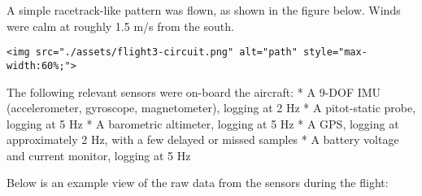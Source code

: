 \documentclass[11pt]{article}
\begin{document}
A simple racetrack-like pattern was flown, as shown in the figure below.
Winds were calm at roughly 1.5 m/s from the south.

\begin{verbatim}
<img src="./assets/flight3-circuit.png" alt="path" style="max-width:60%;">
\end{verbatim}

The following relevant sensors were on-board the aircraft: * A 9-DOF IMU
(accelerometer, gyroscope, magnetometer), logging at 2 Hz * A
pitot-static probe, logging at 5 Hz * A barometric altimeter, logging at
5 Hz * A GPS, logging at approximately 2 Hz, with a few delayed or
missed samples * A battery voltage and current monitor, logging at 5 Hz

    Below is an example view of the raw data from the sensors during the
flight:
\end{document}
